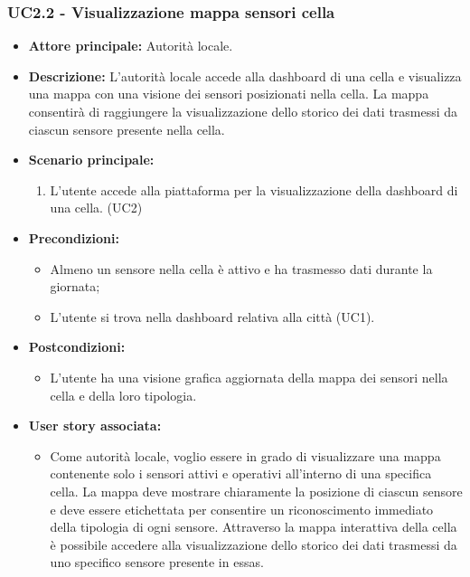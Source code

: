 \subsubsection{UC2.2 - Visualizzazione mappa sensori cella}
\begin{itemize}
    \item \textbf{Attore principale:} Autorità locale.
    \item \textbf{Descrizione:} L'autorità locale accede alla dashboard di una cella e visualizza una mappa con una visione dei sensori posizionati nella cella.
    La mappa consentirà di raggiungere la visualizzazione dello storico dei dati trasmessi da ciascun sensore presente nella cella.
    \item \textbf{Scenario principale:}
    \begin{enumerate}
      \item L'utente accede alla piattaforma per la visualizzazione della dashboard di una cella. (UC2)
    \end{enumerate}
\item \textbf{Precondizioni:}
    \begin{itemize}
        \item  Almeno un sensore nella cella è attivo e ha trasmesso dati durante la giornata;
        \item L'utente si trova nella dashboard relativa alla città (UC1).
    \end{itemize}
    \item \textbf{Postcondizioni:}
          \begin{itemize}
              \item      L'utente ha una visione grafica aggiornata della mappa dei sensori nella cella e della loro tipologia.
          \end{itemize}
    \item \textbf{User story associata:}
          \begin{itemize}
              \item Come autorità locale, voglio essere in grado di visualizzare una mappa contenente solo i sensori attivi e operativi all'interno di una specifica cella. La mappa deve mostrare chiaramente la posizione di ciascun sensore e deve essere etichettata per consentire un riconoscimento immediato della tipologia di ogni sensore.
              Attraverso la mappa interattiva della cella è possibile accedere alla visualizzazione dello storico dei dati trasmessi da uno specifico sensore presente in essas.
          \end{itemize}
\end{itemize}